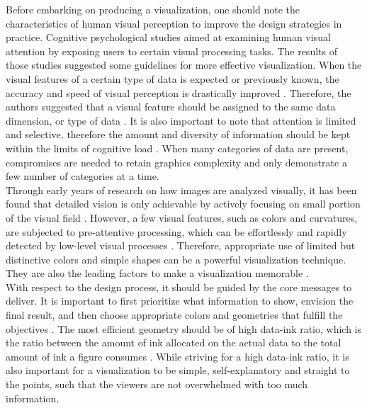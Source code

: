 \documentclass[11pt, a4paper,oneside,chapterprefix=false]{scrbook}
\begin{document}
Before embarking on producing a visualization, one should note the characteristics of human visual perception to improve the design strategies in practice. Cognitive psychological studies aimed at examining human visual attention by exposing users to certain visual processing tasks. The results of those studies suggested some guidelines for more effective visualization. When the visual features of a certain type of data is expected or previously known, the accuracy and speed of visual perception is drastically improved \cite{haroz2012capacity}. Therefore, the authors suggested that a visual feature should be assigned to the same data dimension, or type of data \cite{haroz2012capacity}. It is also important to note that attention is limited and selective, therefore the amount and diversity of information should be kept within the limits of cognitive load \cite{alhadad2018visualizing}. When many categories of data are present, compromises are needed to retain graphics complexity and only demonstrate a few number of categories at a time. \\

Through early years of research on how images are analyzed visually, it has been found that detailed vision is only achievable by actively focusing on small portion of the visual field \cite{itti2001computational, noton1971scanpaths}. However, a few visual features, such as colors and curvatures, are subjected to pre-attentive processing, which can be effortlessly and rapidly detected by low-level visual processes \cite{healey2011attention}. Therefore, appropriate use of limited but distinctive colors and simple shapes can be a powerful visualization technique. They are also the leading factors to make a visualization memorable \cite{borkin2013makes}. \\

With respect to the design process, it should be guided by the core messages to deliver. It is important to first prioritize what information to show, envision the final result, and then choose appropriate colors and geometries that fulfill the objectives \cite{midway2020principles}. The most efficient geometry should be of high data-ink ratio, which is the ratio between the amount of ink allocated on the actual data to the total amount of ink a figure consumes \cite{tufte1983visual}. While striving for a high data-ink ratio, it is also important for a visualization to be simple, self-explanatory  and straight to the points, such that the viewers are not overwhelmed with too much information. \\
\end{document}
